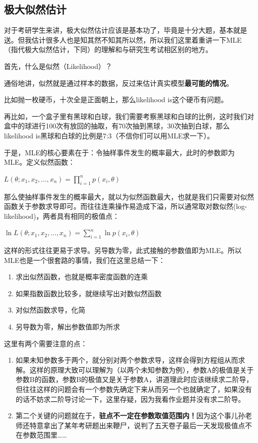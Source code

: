 \documentclass[10pt, a4paper]{article}
\begin{document}
\subsection{极大似然估计}
对于考研学生来讲，极大似然估计应该是基本功了，毕竟是十分大题，基本就是送。但我估计很多人也是知其然不知其所以然，所以我们这里着重讲一下MLE（指代极大似然估计，下同）的理解和与研究生考试相区别的地方。\par
首先，什么是似然（Likelihood）？\par
通俗地讲，似然就是通过样本的数据，反过来估计真实模型\textbf{最可能的情况}。\par
比如抛一枚硬币，十次全是正面朝上，那么likelihood is这个硬币有问题。\par
再比如，一个盒子里有黑球和白球，我们需要考察黑球和白球的比例，这时我们对盒中的球进行100次有放回的抽取，有70次抽到黑球，30次抽到白球，那么likelihood is黑球和白球的比例是7:3（不信你们可以用MLE求一下）。\par
于是，MLE的核心要素在于：令抽样事件发生的概率最大，此时的参数即为MLE。定义似然函数：
\begin{center}
    $L(\theta;x_1,x_2,...,x_n)=\prod _{i=1}^n p(x_i,\theta)$
\end{center} \par
那么使抽样事件发生的概率最大，就以为似然函数最大，也就是我们只需要对似然函数关于参数求导即可。而往往连乘操作易造成下溢，所以通常取对数似然(log-likelihood)，两者具有相同的极值点：\par
\begin{center}
    $\ln L(\theta;x_1,x_2,...,x_n)=\sum _{i=1}^n \ln p(x_i,\theta)$
\end{center} \par
这样的形式往往更易于求导。另导数为零，此式接触的参数值即为MLE。所以MLE也是一个很套路的事情，我们在这里总结一下：\par
\begin{enumerate}
    \item 求出似然函数，也就是概率密度函数的连乘
    \item 如果指数函数比较多，就继续写出对数似然函数
    \item 对似然函数求导，化简
    \item 另导数为零，解出参数值即为所求
\end{enumerate} \par
这里有两个需要注意的点：\par
\begin{enumerate}
    \item 如果未知参数多于两个，就分别对两个参数求导，这样会得到方程组从而求解。这样的原理大致可以理解为（以两个未知参数为例），参数A的极值是关于参数B的函数，参数B的极值又是关于参数A，讲道理此时应该继续求二阶导，但往往这样的问题会有一个参数先确定下来从而另一个也就确定了，如果没有的话不妨求二阶导讨论一下，这里存疑，因为我看作业题并没有求二阶导。
    \item 第二个关键的问题就在于，\textbf{驻点不一定在参数取值范围内！}因为这个事儿孙老师还特意拿出了某年考研题出来鞭尸，说判了五天卷子最后一天发现极值点不在参数范围里……
\end{enumerate} \par
\end{document}
